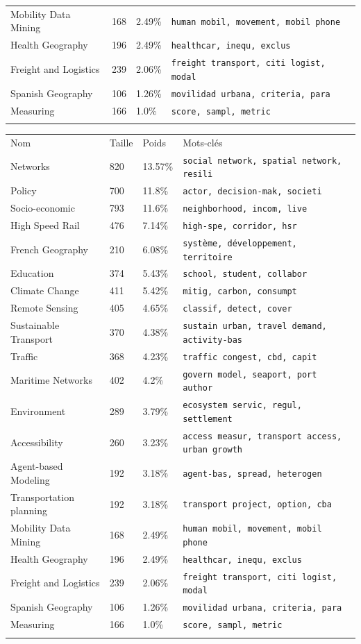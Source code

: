 \begin{table}
{\begin{tabular}{llll}
Mobility Data Mining & 168 & 2.49\% & \texttt{human mobil, movement, mobil phone} \\
Health Geography & 196 & 2.49\% & \texttt{healthcar, inequ, exclus} \\
Freight and Logistics & 239 & 2.06\% & \texttt{freight transport, citi logist, modal} \\
Spanish Geography & 106 & 1.26\% & \texttt{movilidad urbana, criteria, para} \\
Measuring & 166 & 1.0\% & \texttt{score, sampl, metric} \\
\noalign{\smallskip}\hline
\end{tabular}
}{
\begin{tabular}{llll}
\hline\noalign{\smallskip}
Nom & Taille & Poids & Mots-clés  \\
\noalign{\smallskip}\hline\noalign{\smallskip}
Networks & 820 & 13.57\% & \texttt{social network, spatial network, resili} \\
Policy & 700 & 11.8\% & \texttt{actor, decision-mak, societi} \\
Socio-economic & 793 & 11.6\% & \texttt{neighborhood, incom, live} \\
High Speed Rail & 476 & 7.14\% & \texttt{high-spe, corridor, hsr} \\
French Geography & 210 & 6.08\% & \texttt{système, développement, territoire} \\
Education & 374 & 5.43\% & \texttt{school, student, collabor} \\
Climate Change & 411 & 5.42\% & \texttt{mitig, carbon, consumpt} \\
Remote Sensing & 405 & 4.65\% & \texttt{classif, detect, cover} \\
Sustainable Transport & 370 & 4.38\% & \texttt{sustain urban, travel demand, activity-bas} \\
Traffic & 368 & 4.23\% & \texttt{traffic congest, cbd, capit} \\
Maritime Networks & 402 & 4.2\% & \texttt{govern model, seaport, port author} \\
Environment & 289 & 3.79\% & \texttt{ecosystem servic, regul, settlement} \\
Accessibility & 260 & 3.23\% & \texttt{access measur, transport access, urban growth} \\
Agent-based Modeling & 192 & 3.18\% & \texttt{agent-bas, spread, heterogen} \\
Transportation planning & 192 & 3.18\% & \texttt{transport project, option, cba} \\
Mobility Data Mining & 168 & 2.49\% & \texttt{human mobil, movement, mobil phone} \\
Health Geography & 196 & 2.49\% & \texttt{healthcar, inequ, exclus} \\
Freight and Logistics & 239 & 2.06\% & \texttt{freight transport, citi logist, modal} \\
Spanish Geography & 106 & 1.26\% & \texttt{movilidad urbana, criteria, para} \\
Measuring & 166 & 1.0\% & \texttt{score, sampl, metric} \\
\noalign{\smallskip}\hline
\end{tabular}
}
\end{table}
